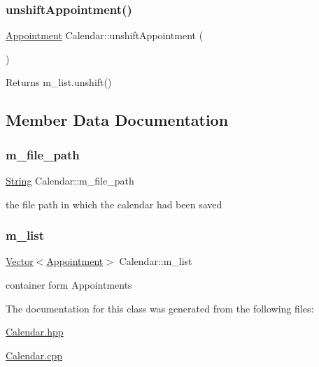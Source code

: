 \subsubsection{\texorpdfstring{unshift\+Appointment()}{unshiftAppointment()}}
{\footnotesize\ttfamily \hyperlink{classAppointment}{Appointment} Calendar\+::unshift\+Appointment (\begin{DoxyParamCaption}{ }\end{DoxyParamCaption})}

\begin{DoxyReturn}{Returns}
m\+\_\+list.\+unshift() 
\end{DoxyReturn}


\subsection{Member Data Documentation}
\mbox{\label{classCalendar_a886351ebec41505485aa58503c6448d6}} 
\subsubsection{\texorpdfstring{m\+\_\+file\+\_\+path}{m\_file\_path}}
{\footnotesize\ttfamily \hyperlink{classString}{String} Calendar\+::m\+\_\+file\+\_\+path\hspace{0.3cm}{\ttfamily [private]}}



the file path in which the calendar had been saved 

\mbox{\label{classCalendar_a4cf793b2acf7116988fd212628f79a59}} 
\subsubsection{\texorpdfstring{m\+\_\+list}{m\_list}}
{\footnotesize\ttfamily \hyperlink{classVector}{Vector}$<$\hyperlink{classAppointment}{Appointment}$>$ Calendar\+::m\+\_\+list\hspace{0.3cm}{\ttfamily [private]}}



container form Appointments 



The documentation for this class was generated from the following files\+:\begin{DoxyCompactItemize}
\item 
\hyperlink{Calendar_8hpp}{Calendar.\+hpp}\item 
\hyperlink{Calendar_8cpp}{Calendar.\+cpp}\end{DoxyCompactItemize}
